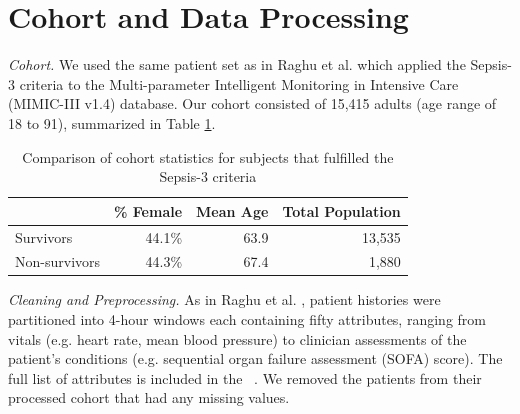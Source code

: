 \documentclass[10pt]{amia}
\begin{document}


\section*{Cohort and Data Processing}

\textit{Cohort.} We used the same patient set as in Raghu et al. \cite{DBLP:journals/corr/RaghuKCSG17} which applied the Sepsis-3 
criteria to the Multi-parameter Intelligent Monitoring in Intensive Care (MIMIC-III v1.4) database. \cite{johnson2016mimic} Our cohort consisted of 15,415 adults (age range of 18 to 91), summarized in Table \ref{table:demographics}. 

\begin{table}[h]
\centering
\caption{Comparison of cohort statistics for subjects that fulfilled the Sepsis-3 criteria}
\label{table:demographics}
\begin{tabular}{|l|r|r|r|}
\hline
 & \% Female & Mean Age & Total Population \\
 \hline
 Survivors & 44.1\% & 63.9 &13,535 \\
 \hline
 Non-survivors & 44.3\% & 67.4 & 1,880 \\
 \hline
\end{tabular}
\end{table}

\textit{Cleaning and Preprocessing.}
As in Raghu et al. \cite{DBLP:journals/corr/RaghuKCSG17}, patient histories were partitioned into 4-hour windows each containing fifty attributes, ranging from vitals (e.g. heart rate, mean blood pressure) to clinician assessments of the patient's conditions (e.g. sequential organ failure assessment (SOFA) score).  The full list of attributes is included in the ~. %
We removed the patients from their processed cohort that had any missing values. 
\end{document}
